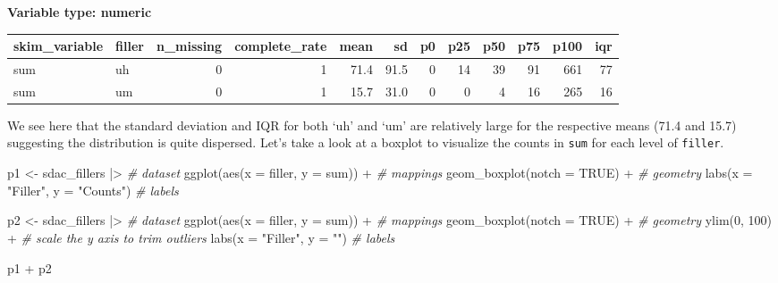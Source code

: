 \documentclass[
  letterpaper,
]{scrbook}
\newenvironment{Shaded}{\begin{snugshade}}{\end{snugshade}}
\newcommand{\AttributeTok}[1]{\textcolor[rgb]{0.00,0.00,0.00}{#1}}
\newcommand{\CommentTok}[1]{\textcolor[rgb]{0.00,0.00,0.00}{\textit{#1}}}
\newcommand{\ConstantTok}[1]{\textcolor[rgb]{0.00,0.00,0.00}{#1}}
\newcommand{\DecValTok}[1]{\textcolor[rgb]{0.00,0.00,0.00}{#1}}
\newcommand{\FunctionTok}[1]{\textcolor[rgb]{0.00,0.00,0.00}{#1}}
\newcommand{\NormalTok}[1]{\textcolor[rgb]{0.00,0.00,0.00}{#1}}
\newcommand{\OtherTok}[1]{\textcolor[rgb]{0.00,0.00,0.00}{#1}}
\newcommand{\SpecialCharTok}[1]{\textcolor[rgb]{0.00,0.00,0.00}{#1}}
\newcommand{\StringTok}[1]{\textcolor[rgb]{0.00,0.00,0.00}{#1}}
\begin{document}
\textbf{Variable type: numeric}

\begin{tabular}{l|l|r|r|r|r|r|r|r|r|r|r}
\hline
skim\_variable & filler & n\_missing & complete\_rate & mean & sd & p0 & p25 & p50 & p75 & p100 & iqr\\
\hline
sum & uh & 0 & 1 & 71.4 & 91.5 & 0 & 14 & 39 & 91 & 661 & 77\\
\hline
sum & um & 0 & 1 & 15.7 & 31.0 & 0 & 0 & 4 & 16 & 265 & 16\\
\hline
\end{tabular}

We see here that the standard deviation and IQR for both `uh' and `um'
are relatively large for the respective means (71.4 and 15.7) suggesting
the distribution is quite dispersed. Let's take a look at a boxplot to
visualize the counts in \texttt{sum} for each level of \texttt{filler}.

\begin{Shaded}
\begin{Highlighting}[]
\NormalTok{p1 }\OtherTok{\textless{}{-}} 
\NormalTok{  sdac\_fillers }\SpecialCharTok{|\textgreater{}} \CommentTok{\# dataset}
  \FunctionTok{ggplot}\NormalTok{(}\FunctionTok{aes}\NormalTok{(}\AttributeTok{x =}\NormalTok{ filler, }\AttributeTok{y =}\NormalTok{ sum)) }\SpecialCharTok{+} \CommentTok{\# mappings}
  \FunctionTok{geom\_boxplot}\NormalTok{(}\AttributeTok{notch =} \ConstantTok{TRUE}\NormalTok{) }\SpecialCharTok{+} \CommentTok{\# geometry}
  \FunctionTok{labs}\NormalTok{(}\AttributeTok{x =} \StringTok{"Filler"}\NormalTok{, }\AttributeTok{y =} \StringTok{"Counts"}\NormalTok{) }\CommentTok{\# labels}

\NormalTok{p2 }\OtherTok{\textless{}{-}} 
\NormalTok{  sdac\_fillers }\SpecialCharTok{|\textgreater{}} \CommentTok{\# dataset}
  \FunctionTok{ggplot}\NormalTok{(}\FunctionTok{aes}\NormalTok{(}\AttributeTok{x =}\NormalTok{ filler, }\AttributeTok{y =}\NormalTok{ sum)) }\SpecialCharTok{+} \CommentTok{\# mappings}
  \FunctionTok{geom\_boxplot}\NormalTok{(}\AttributeTok{notch =} \ConstantTok{TRUE}\NormalTok{) }\SpecialCharTok{+} \CommentTok{\# geometry}
  \FunctionTok{ylim}\NormalTok{(}\DecValTok{0}\NormalTok{, }\DecValTok{100}\NormalTok{) }\SpecialCharTok{+} \CommentTok{\# scale the y axis to trim outliers}
  \FunctionTok{labs}\NormalTok{(}\AttributeTok{x =} \StringTok{"Filler"}\NormalTok{, }\AttributeTok{y =} \StringTok{""}\NormalTok{) }\CommentTok{\# labels}

\NormalTok{p1 }\SpecialCharTok{+}\NormalTok{ p2}
\end{Highlighting}
\end{Shaded}
\end{document}
